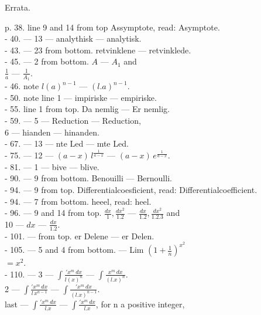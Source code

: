 \documentclass[12pt,a4paper,openany]{book}
\begin{document}
\clearpage
\begin{center}{\large Errata.}\end{center}
{\small\noindent
p. 38. line 9 and 14 from top Assymptote, read: Asymptote.\\
- 40. --- 13 --- analythisk --- analytisk.\\
- 43. --- 23 from bottom. retvinklene --- retvinklede.\\
- 45. --- 2 from bottom. $A$ --- $A_1$ and\\
$\frac{1}{a}$ --- $\frac{1}{A_1}$.\\
- 46. note $l(a)^{n-1}$ --- $(l.a)^{n-1}$.\\
- 50. note line 1 --- impiriske --- empiriske.\\
- 55. line 1 from top. Da nemlig --- Er nemlig.\\
- 59. --- 5 --- Reduction --- Reduction,\\
6 --- hianden --- hinanden.\\
- 67. --- 13 --- nte Led --- mte Led.\\
- 75. --- 12 --- $(a - x)\,l^{\frac{1}{a-x}}$ --- $(a - x)\,e^{\frac{1}{a-x}}$.\\
- 81. --- 1 --- bive --- blive.\\
- 90. --- 9 from bottom. Benouilli --- Bernoulli.\\
- 94. --- 9 from top. Differentialcoesficient, read: Differentialcoefficient.\\
- 94. --- 7 from bottom. heeel, read: heel.\\
- 96. --- 9 and 14 from top. $\frac{dx}{1}, \frac{dx^2}{1.2}$ --- $\frac{dx}{1.2}, \frac{dx^2}{1.2.3}$ and\\
10 --- $dx$ --- $\frac{dx}{1.2}$.\\
- 101. --- from top. er Delene --- er Delen.\\
- 105. --- 5 and 4 from bottom. --- Lim $\left(1+\frac{1}{n}\right)^{x^2}$\\
$= x^2$.\\
- 110. --- 3 --- $\int \frac{'x^m\,dx}{l(x)^n}$ --- $\int \frac{x^m\,dx}{(l.x)^n}$.\\
2 --- $\int \frac{'x^m\,dx}{l\,x^{n-1}}$ --- $\int \frac{'x^m\,dx}{(l.x)^{n-1}}$.\\
last --- $\int \frac{'x^m\,dx}{l.x}$ --- $\int \frac{'x^m\,dx}{l.x}$, for n a positive integer,\\
}
\end{document}

